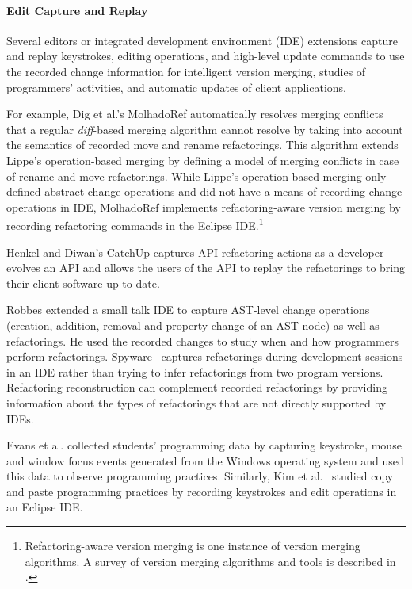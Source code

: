 \documentclass[runningheads,a4paper]{llncs}
\begin{document}
\paragraph{Edit Capture and Replay} 
Several editors or integrated development environment (IDE) extensions capture and replay keystrokes, editing operations, and high-level update commands to use the recorded change information for intelligent version merging, studies of programmers' activities, and automatic updates of client applications. 

For example, Dig et al.'s MolhadoRef \cite{Dig2007} automatically resolves merging conflicts that a regular {\it diff}-based merging algorithm cannot resolve by taking into account the semantics of recorded move and rename refactorings. This algorithm extends Lippe's operation-based merging \cite{Lippe1992} by defining a model of merging conflicts in case of rename and move refactorings. While Lippe's operation-based merging only defined abstract change operations and did not have a means of recording change operations in IDE, MolhadoRef implements refactoring-aware version merging by recording refactoring commands in the Eclipse IDE.\footnote{Refactoring-aware version merging is one instance of version merging algorithms. A survey of version merging algorithms and tools is described in \cite{Mens2002}.}

Henkel and Diwan's CatchUp \cite{Henkel2005} captures API refactoring actions as a developer evolves an API and allows the users of the API to replay the refactorings to bring their client software up to date. 

Robbes \cite{Robbes2007} extended a small talk IDE to capture AST-level change operations (creation, addition, removal and property change of an AST node) as well as refactorings. He used the recorded changes to study when and how programmers perform refactorings. Spyware~\cite{Robbes2008:spyware} captures refactorings during development sessions in an IDE rather than trying to infer refactorings from two program versions. Refactoring reconstruction can complement recorded refactorings by providing information about the types of refactorings that are not directly supported by IDEs.


Evans et al. \cite{Evans2003} collected students' programming data by capturing keystroke, mouse and window focus events generated from the Windows operating system and used this data to observe programming practices. Similarly, Kim et al.~\cite{Kim2004} studied copy and paste programming practices by recording keystrokes and edit operations in an Eclipse IDE. 
\end{document}
